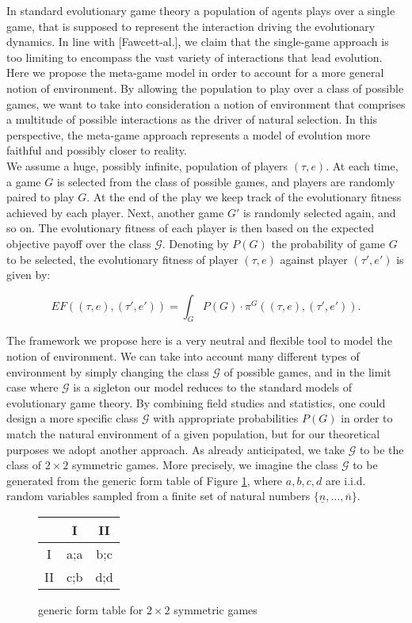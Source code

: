 \documentclass[fleqn,reqno,11pt]{article}
\begin{document}
In standard evolutionary game theory a population of agents plays over a single game, that is supposed to represent the interaction driving the evolutionary dynamics. In line with [Fawcett-al.], we claim that the single-game approach is too limiting to encompass the vast variety of interactions that lead evolution. Here we propose the meta-game model in order to account for a more general notion of environment. By allowing the population to play over a class of possible games, we want to take into consideration a notion of environment that comprises a multitude of possible interactions as the driver of natural selection. In this perspective, the meta-game approach represents a model of evolution more faithful and possibly closer to reality. \\
We assume a huge, possibly infinite, population of players $(\tau,e)$. At each time, a game $G$ is selected from the class of possible games, and players are randomly paired to play $G$. At the end of the play we keep track of the evolutionary fitness achieved by each player. Next, another game $G'$ is randomly selected again, and so on. The evolutionary fitness of each player is then based on the expected objective payoff over the class $\mathcal{G}$. Denoting by $P(G)$ the probability of game $G$ to be selected, the evolutionary fitness of player $(\tau,e)$ against player $(\tau',e')$ is given by: 

$$ EF((\tau,e),(\tau',e'))= \int_G  P(G) \cdot \pi^G((\tau, e),(\tau', e')).  $$

\noindent The framework we propose here is a very neutral and flexible tool to model the notion of environment. We can take into account many different types of environment by simply changing the class $\mathcal{G}$ of possible games, and in the limit case where $\mathcal{G}$ is a sigleton our model reduces to the standard models of evolutionary game theory. 
By combining field studies and statistics, one could design a more specific class $\mathcal{G}$ with appropriate probabilities $P(G)$ in order to match the natural environment of a given population, but for our theoretical purposes we adopt another approach. As already anticipated, we take $\mathcal{G}$ to be the class of $2 \times 2$ symmetric games. More precisely, we imagine the class $\mathcal{G}$ to be generated from the generic form table of Figure \ref{generic form table}, where $a,b,c,d$ are i.i.d. random variables sampled from a finite set of natural numbers $ \lbrace \underline{n}, \dots, \overline{n}  \rbrace$.


\begin{figure}
\begin{center}%
\begin{tabular}{|c|c|c|}
\hline 
 & I & II\tabularnewline
\hline 
\hline 
I & a;a & b;c\tabularnewline
\hline 
II & c;b & d;d\tabularnewline
\hline 
\end{tabular}\end{center}

\protect\caption{generic form table for $2 \times 2$ symmetric games}
\label{generic form table}
\end{figure}
\end{document}
